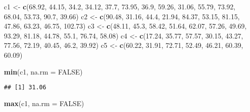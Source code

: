 \documentclass[
]{article}
\newenvironment{Shaded}{\begin{snugshade}}{\end{snugshade}}
\newcommand{\AttributeTok}[1]{\textcolor[rgb]{0.13,0.29,0.53}{#1}}
\newcommand{\ConstantTok}[1]{\textcolor[rgb]{0.56,0.35,0.01}{#1}}
\newcommand{\FloatTok}[1]{\textcolor[rgb]{0.00,0.00,0.81}{#1}}
\newcommand{\FunctionTok}[1]{\textcolor[rgb]{0.13,0.29,0.53}{\textbf{#1}}}
\newcommand{\NormalTok}[1]{#1}
\newcommand{\OtherTok}[1]{\textcolor[rgb]{0.56,0.35,0.01}{#1}}
\begin{document}
\begin{Shaded}
\begin{Highlighting}[]
\NormalTok{c1 }\OtherTok{\textless{}{-}} \FunctionTok{c}\NormalTok{(}\FloatTok{68.92}\NormalTok{, }\FloatTok{44.15}\NormalTok{, }\FloatTok{34.2}\NormalTok{, }\FloatTok{34.12}\NormalTok{, }\FloatTok{37.7}\NormalTok{, }\FloatTok{73.95}\NormalTok{, }\FloatTok{36.9}\NormalTok{, }\FloatTok{59.26}\NormalTok{, }\FloatTok{31.06}\NormalTok{, }\FloatTok{55.79}\NormalTok{, }\FloatTok{73.92}\NormalTok{, }\FloatTok{68.04}\NormalTok{, }\FloatTok{53.73}\NormalTok{, }\FloatTok{90.7}\NormalTok{, }\FloatTok{39.66}\NormalTok{)}
\NormalTok{c2 }\OtherTok{\textless{}{-}} \FunctionTok{c}\NormalTok{(}\FloatTok{90.48}\NormalTok{, }\FloatTok{31.16}\NormalTok{, }\FloatTok{44.4}\NormalTok{, }\FloatTok{21.94}\NormalTok{, }\FloatTok{84.37}\NormalTok{, }\FloatTok{53.15}\NormalTok{, }\FloatTok{81.15}\NormalTok{, }\FloatTok{47.86}\NormalTok{, }\FloatTok{63.23}\NormalTok{, }\FloatTok{46.75}\NormalTok{, }\FloatTok{102.73}\NormalTok{)}
\NormalTok{c3 }\OtherTok{\textless{}{-}} \FunctionTok{c}\NormalTok{(}\FloatTok{48.11}\NormalTok{, }\FloatTok{45.3}\NormalTok{, }\FloatTok{58.42}\NormalTok{, }\FloatTok{51.64}\NormalTok{, }\FloatTok{62.07}\NormalTok{, }\FloatTok{57.26}\NormalTok{, }\FloatTok{49.69}\NormalTok{, }\FloatTok{93.29}\NormalTok{, }\FloatTok{81.18}\NormalTok{, }\FloatTok{44.78}\NormalTok{, }\FloatTok{55.1}\NormalTok{, }\FloatTok{76.74}\NormalTok{, }\FloatTok{58.08}\NormalTok{)}
\NormalTok{c4 }\OtherTok{\textless{}{-}} \FunctionTok{c}\NormalTok{(}\FloatTok{17.24}\NormalTok{, }\FloatTok{35.77}\NormalTok{, }\FloatTok{57.57}\NormalTok{, }\FloatTok{30.15}\NormalTok{, }\FloatTok{43.27}\NormalTok{, }\FloatTok{77.56}\NormalTok{, }\FloatTok{72.19}\NormalTok{, }\FloatTok{40.45}\NormalTok{, }\FloatTok{46.2}\NormalTok{, }\FloatTok{39.92}\NormalTok{)}
\NormalTok{c5 }\OtherTok{\textless{}{-}} \FunctionTok{c}\NormalTok{(}\FloatTok{60.22}\NormalTok{, }\FloatTok{31.91}\NormalTok{, }\FloatTok{72.71}\NormalTok{, }\FloatTok{52.49}\NormalTok{, }\FloatTok{46.21}\NormalTok{, }\FloatTok{60.39}\NormalTok{, }\FloatTok{60.09}\NormalTok{)}

\FunctionTok{min}\NormalTok{(c1, }\AttributeTok{na.rm =} \ConstantTok{FALSE}\NormalTok{)}
\end{Highlighting}
\end{Shaded}

\begin{verbatim}
## [1] 31.06
\end{verbatim}

\begin{Shaded}
\begin{Highlighting}[]
\FunctionTok{max}\NormalTok{(c1, }\AttributeTok{na.rm =} \ConstantTok{FALSE}\NormalTok{)}
\end{Highlighting}
\end{Shaded}
\end{document}
